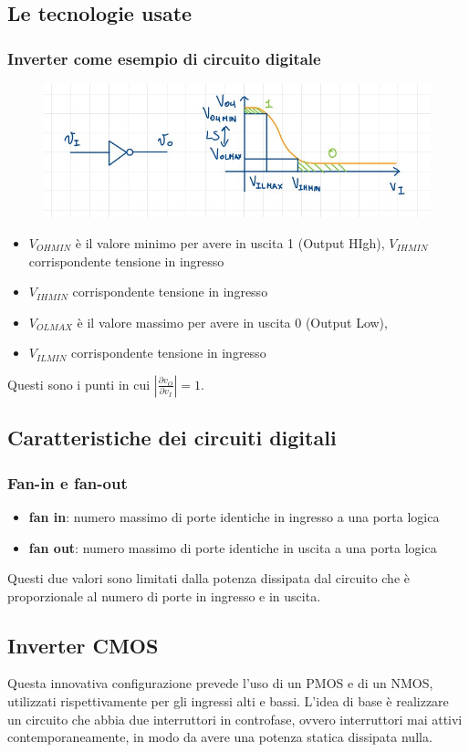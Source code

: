 \documentclass[11pt,a4paper,]{article}
\begin{document}
\subsection{Le tecnologie usate}
\subsubsection{Inverter come esempio di circuito digitale}
\begin{figure}[H]
    \centering
    \includegraphics[width=0.5\linewidth]{img/inv dig.png}
\end{figure}
\begin{itemize}
    \item $V_{OHMIN}$ è il valore minimo per avere in uscita 1 (Output HIgh), $V_{IHMIN}$ corrispondente tensione in ingresso
    \item $V_{IHMIN}$ corrispondente tensione in ingresso
    \item $V_{OLMAX}$ è il valore massimo per avere in uscita 0 (Output Low), 
    \item $V_{ILMIN}$ corrispondente tensione in ingresso
\end{itemize}
Questi sono i punti in cui $|\frac{\partial v_O}{\partial v_I}|=1$.

\subsection{Caratteristiche dei circuiti digitali}
\subsubsection{Fan-in e fan-out}
\begin{itemize}
	\item \textbf{fan in}: numero massimo di porte identiche in ingresso a una porta logica
	\item \textbf{fan out}: numero massimo di porte identiche in uscita a una porta logica
\end{itemize}
Questi due valori sono limitati dalla potenza dissipata dal circuito che è proporzionale al numero di porte in ingresso e in uscita.
\subsection{Inverter CMOS}
Questa innovativa configurazione prevede l'uso di un PMOS e di un NMOS, utilizzati rispettivamente per gli ingressi alti e bassi. 
L'idea di base è realizzare un circuito che abbia due interruttori in controfase, ovvero interruttori mai attivi contemporaneamente, in modo da avere una potenza statica dissipata nulla.
\end{document}
